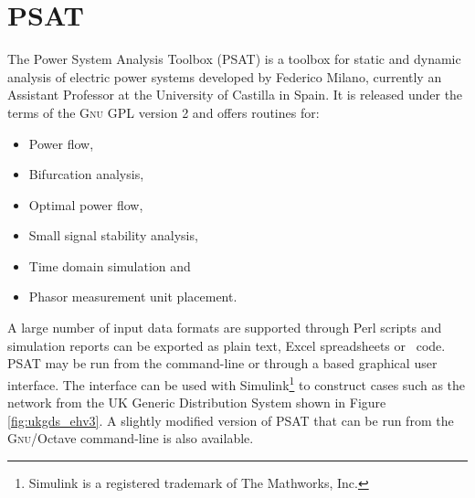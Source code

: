 \section{PSAT}
\label{sec:psat}
The Power System Analysis Toolbox (PSAT) is a \matlab toolbox for static and
dynamic analysis of electric power systems developed by Federico Milano,
currently an Assistant Professor at the University of Castilla in Spain. It is
released under the terms of the \textsc{Gnu} GPL
version 2 and offers routines for:
\begin{itemize}
	\item Power flow,
	\item Bifurcation analysis,
	\item Optimal power flow,
	\item Small signal stability analysis,
	\item Time domain simulation and
	\item Phasor measurement unit placement.
\end{itemize}
A large number of input data formats are supported through Perl scripts and
simulation reports can be exported as plain text, Excel spreadsheets or
\LaTeXe~code.  PSAT may be run from the \matlab command-line or through a
\matlab based graphical user interface.  The interface can be used with
Simulink\footnote{Simulink is a registered trademark of The Mathworks, Inc.}
to construct cases such as the network from the UK Generic Distribution System
shown in Figure \ref{fig:ukgds_ehv3}.  A slightly modified version of PSAT that
can be run from the \textsc{Gnu}/Octave command-line is also available.



